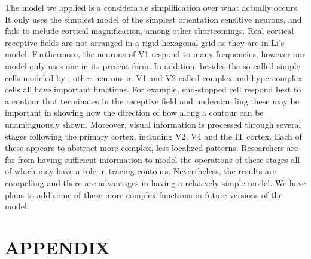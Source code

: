 \documentclass[prodmode,acmtap]{acmlarge}
\begin{document}
The model we applied is a considerable simplification over what
actually occurs. It only uses the simplest model of the simplest
orientation sensitive neurons, and fails to include cortical
magnification, among other shortcomings. Real cortical receptive
fields are not arranged in a rigid hexagonal grid as they are in Li's
model. Furthermore, the neurons of V1 respond to many frequencies,
however our model only uses one in its present form. In addition,
besides the so-called simple cells modeled by , other
neurons in V1 and V2 called complex and hypercomplex cells all have
important functions. For example, end-stopped cell respond best to a
contour that terminates in the receptive field and understanding
these may be important in showing how the direction of flow along a
contour can be unambiguously shown. Moreover, visual information is
processed through several stages following the primary cortex,
including V2, V4 and the IT cortex. Each of these appears to abstract
more complex, less localized patterns. Researchers are far from
having sufficient information to model the operations of these stages
all of which may have a role in tracing contours. Nevertheless, the
results are compelling and there are advantages in having a
relatively simple model. We have plans to add some of these more
complex functions in future versions of the model.



\appendix
\section*{APPENDIX}
\setcounter{section}{1}
\end{document}
